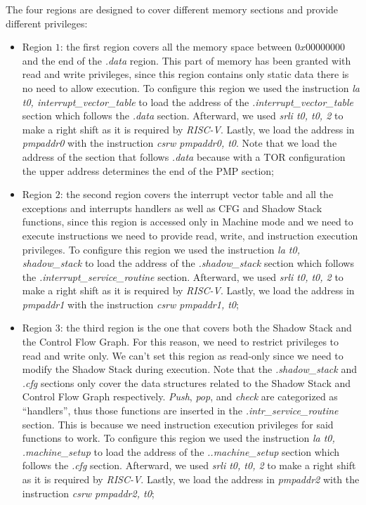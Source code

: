 The four regions are designed to cover different memory sections and provide
different privileges:
\begin{itemize}
  \item Region $1$: the first region covers all the memory space between
    $0x00000000$ and the end of the \textit{.data} region. This part of memory
    has been granted with read and write privileges, since this region contains only
    static data there is no need to allow execution. To configure this region we
    used the instruction \textit{la t0, interrupt\_vector\_table} to load the address
    of the \textit{.interrupt\_vector\_table} section which follows the \textit{.data}
    section. Afterward, we used \textit{srli t0, t0, 2} to make a right shift as
    it is required by \textit{RISC-V}. Lastly, we load the address in \textit{pmpaddr0}
    with the instruction \textit{csrw pmpaddr0, t0}. Note that we load the
    address of the section that follows \textit{.data} because with a TOR configuration
    the upper address determines the end of the PMP section;

  \item Region $2$: the second region covers the interrupt vector table and all
    the exceptions and interrupts handlers as well as CFG and Shadow Stack
    functions, since this region is accessed only in Machine mode and we need to
    execute instructions we need to provide read, write, and instruction execution
    privileges. To configure this region we used the instruction \textit{la t0, shadow\_stack}
    to load the address of the \textit{.shadow\_stack} section which follows the
    \textit{.interrupt\_service\_routine} section. Afterward, we used \textit{srli
    t0, t0, 2} to make a right shift as it is required by \textit{RISC-V}.
    Lastly, we load the address in \textit{pmpaddr1} with the instruction
    \textit{csrw pmpaddr1, t0};

  \item Region $3$: the third region is the one that covers both the Shadow
    Stack and the Control Flow Graph. For this reason, we need to restrict
    privileges to read and write only. We can't set this region as read-only since
    we need to modify the Shadow Stack during execution. Note that the \textit{.shadow\_stack}
    and \textit{.cfg} sections only cover the data structures related to the
    Shadow Stack and Control Flow Graph respectively. \textit{Push}, \textit{pop},
    and \textit{check} are categorized as ``handlers'', thus those functions are
    inserted in the \textit{.intr\_service\_routine} section. This is because we
    need instruction execution privileges for said functions to work. To
    configure this region we used the instruction \textit{la t0, .machine\_setup}
    to load the address of the \textit{..machine\_setup} section which follows
    the \textit{.cfg} section. Afterward, we used \textit{srli t0, t0, 2} to
    make a right shift as it is required by \textit{RISC-V}. Lastly, we load the
    address in \textit{pmpaddr2} with the instruction \textit{csrw pmpaddr2, t0};


\end{itemize}
